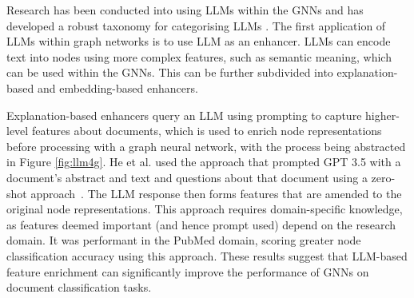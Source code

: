 \documentclass[10pt,oneside]{book}
\begin{document}
Research has been conducted into using LLMs within the GNNs and has developed a robust taxonomy for categorising LLMs \cite{ren_survey_2024}. The first application of LLMs within graph networks is to use LLM as an enhancer. LLMs can encode text into nodes using more complex features, such as semantic meaning, which can be used within the GNNs. This can be further subdivided into explanation-based and embedding-based enhancers. 
    
Explanation-based enhancers query an LLM using prompting to capture higher-level features about documents, which is used to enrich node representations before processing with a graph neural network, with the process being abstracted in Figure \ref{fig:llm4g}. He et al. used the approach that prompted GPT 3.5 with a document's abstract and text and questions about that document using a zero-shot approach~\cite{he_harnessing_2024}. The LLM response then forms features that are amended to the original node representations. This approach requires domain-specific knowledge, as features deemed important (and hence prompt used) depend on the research domain. It was performant in the PubMed domain, scoring greater node classification accuracy using this approach. These results suggest that LLM-based feature enrichment can significantly improve the performance of GNNs on document classification tasks.
\end{document}
